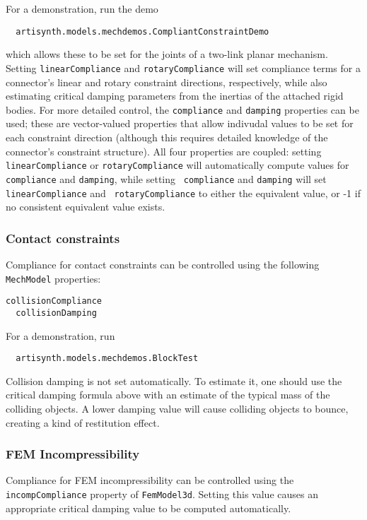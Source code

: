 \documentclass{article}
\begin{document}
For a demonstration, run the demo 
\begin{verbatim}
  artisynth.models.mechdemos.CompliantConstraintDemo
\end{verbatim}
which allows these to be set for the joints of a two-link planar
mechanism. Setting {\tt linearCompliance} and {\tt rotaryCompliance}
will set compliance terms for a connector's linear and rotary
constraint directions, respectively, while also estimating critical
damping parameters from the inertias of the attached rigid bodies.  For
more detailed control, the {\tt compliance} and {\tt damping}
properties can be used; these are vector-valued properties that allow
indivudal values to be set for each constraint direction (although
this requires detailed knowledge of the connector's constraint
structure). All four properties are coupled: setting {\tt
linearCompliance} or {\tt rotaryCompliance} will automatically compute
values for {\tt compliance} and {\tt damping}, while setting {\tt
compliance} and {\tt damping} will set {\tt linearCompliance} and {\tt
rotaryCompliance} to either the equivalent value, or -1 if no
consistent equivalent value exists.

\subsubsection*{Contact constraints}

Compliance for contact constraints can be controlled using the
following {\tt MechModel} properties:

\begin{lstlisting}[]
  collisionCompliance
  collisionDamping
\end{lstlisting}

For a demonstration, run 
\begin{verbatim}
  artisynth.models.mechdemos.BlockTest
\end{verbatim}

Collision damping is not set automatically. To estimate it, one should
use the critical damping formula above with an estimate of the typical
mass of the colliding objects. A lower damping value will cause colliding
objects to bounce, creating a kind of restitution effect.

\subsubsection*{FEM Incompressibility}

Compliance for FEM incompressibility can be controlled using the {\tt
incompCompliance} property of {\tt FemModel3d}. Setting this value
causes an appropriate critical damping value to be computed
automatically.
\end{document}
